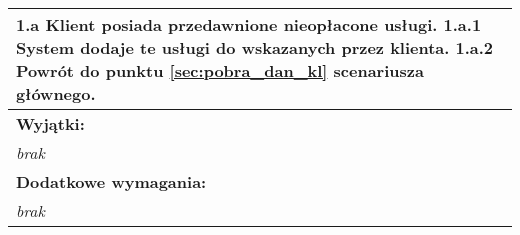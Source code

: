 \begin{center}
\begin{longtable}[h]{|p{1.6cm}|p{13.5cm}|}
\multicolumn{2}{|p{15.1cm}|}{
1.a Klient posiada przedawnione nieopłacone usługi. \newline
1.a.1 System dodaje te usługi do wskazanych przez klienta. \newline
1.a.2 Powrót do punktu \ref{sec:pobra_dan_kl} scenariusza głównego.
} \\ \hline
\multicolumn{2}{|p{15.1cm}|}{\textbf{Wyjątki:}} \\
\multicolumn{2}{|p{15.1cm}|}{
\textit{brak}
} \\ \hline
\multicolumn{2}{|p{15.1cm}|}{\textbf{Dodatkowe wymagania:}} \\
\multicolumn{2}{|p{15.1cm}|}{
\textit{brak}
} \\
\hline
\end{longtable}
\end{center}

